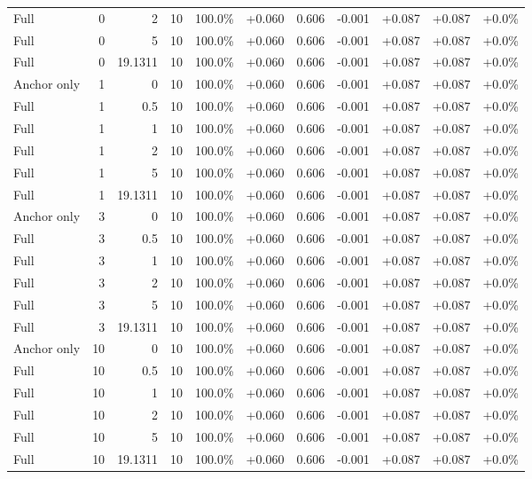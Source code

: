 \begin{table}[htbp]
\begin{tabular}{lrrrccccccc}
Full & 0 & 2 & 10 & 100.0\% & +0.060 & 0.606 & -0.001 & +0.087 & +0.087 & +0.0\% \\
Full & 0 & 5 & 10 & 100.0\% & +0.060 & 0.606 & -0.001 & +0.087 & +0.087 & +0.0\% \\
Full & 0 & 19.1311 & 10 & 100.0\% & +0.060 & 0.606 & -0.001 & +0.087 & +0.087 & +0.0\% \\
Anchor only & 1 & 0 & 10 & 100.0\% & +0.060 & 0.606 & -0.001 & +0.087 & +0.087 & +0.0\% \\
Full & 1 & 0.5 & 10 & 100.0\% & +0.060 & 0.606 & -0.001 & +0.087 & +0.087 & +0.0\% \\
Full & 1 & 1 & 10 & 100.0\% & +0.060 & 0.606 & -0.001 & +0.087 & +0.087 & +0.0\% \\
Full & 1 & 2 & 10 & 100.0\% & +0.060 & 0.606 & -0.001 & +0.087 & +0.087 & +0.0\% \\
Full & 1 & 5 & 10 & 100.0\% & +0.060 & 0.606 & -0.001 & +0.087 & +0.087 & +0.0\% \\
Full & 1 & 19.1311 & 10 & 100.0\% & +0.060 & 0.606 & -0.001 & +0.087 & +0.087 & +0.0\% \\
Anchor only & 3 & 0 & 10 & 100.0\% & +0.060 & 0.606 & -0.001 & +0.087 & +0.087 & +0.0\% \\
Full & 3 & 0.5 & 10 & 100.0\% & +0.060 & 0.606 & -0.001 & +0.087 & +0.087 & +0.0\% \\
Full & 3 & 1 & 10 & 100.0\% & +0.060 & 0.606 & -0.001 & +0.087 & +0.087 & +0.0\% \\
Full & 3 & 2 & 10 & 100.0\% & +0.060 & 0.606 & -0.001 & +0.087 & +0.087 & +0.0\% \\
Full & 3 & 5 & 10 & 100.0\% & +0.060 & 0.606 & -0.001 & +0.087 & +0.087 & +0.0\% \\
Full & 3 & 19.1311 & 10 & 100.0\% & +0.060 & 0.606 & -0.001 & +0.087 & +0.087 & +0.0\% \\
Anchor only & 10 & 0 & 10 & 100.0\% & +0.060 & 0.606 & -0.001 & +0.087 & +0.087 & +0.0\% \\
Full & 10 & 0.5 & 10 & 100.0\% & +0.060 & 0.606 & -0.001 & +0.087 & +0.087 & +0.0\% \\
Full & 10 & 1 & 10 & 100.0\% & +0.060 & 0.606 & -0.001 & +0.087 & +0.087 & +0.0\% \\
Full & 10 & 2 & 10 & 100.0\% & +0.060 & 0.606 & -0.001 & +0.087 & +0.087 & +0.0\% \\
Full & 10 & 5 & 10 & 100.0\% & +0.060 & 0.606 & -0.001 & +0.087 & +0.087 & +0.0\% \\
Full & 10 & 19.1311 & 10 & 100.0\% & +0.060 & 0.606 & -0.001 & +0.087 & +0.087 & +0.0\% \\

\end{tabular}
\end{table}

